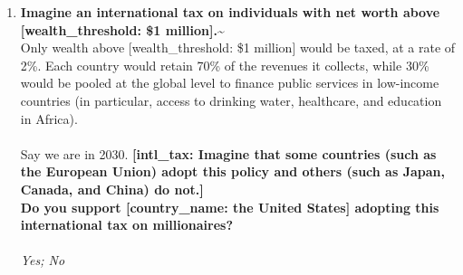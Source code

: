 \begin{enumerate}[resume]
\item  \label{q:intl_tax_support} \textbf{Imagine an international tax on individuals with net worth above [wealth\_threshold: \$1 million].\~}\\Only wealth above [wealth\_threshold: \$1 million] would be taxed, at a rate of 2\%. Each country would retain 70\% of the revenues it collects, while 30\% would be pooled at the global level to finance public services in low-income countries (in particular, access to drinking water, healthcare, and education in Africa). \\\\Say we are in 2030.\textbf{ [intl\_tax: Imagine that some countries  (such as the European Union) adopt this policy and others (such as Japan, Canada, and China) do not.]\\Do you support [country\_name: the United States] adopting this international tax on millionaires?}\\ [\textit{Figure \ref{fig:intl_tax_support}}; 
\verb|intl_tax_support|]
  \\ \textit{Yes; No}

\end{enumerate} 

